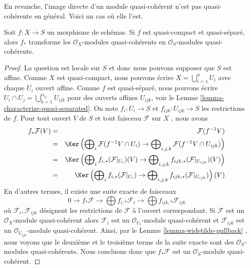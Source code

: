 En revanche, l'image directe d'un module quasi-cohérent n'est pas
quasi-cohérente en général. Voici un cas où elle l'est.

\begin{lemma}
\label{lemma-push-forward-quasi-coherent}
Soit  $f : X \to S$  un morphisme de schémas. Si  $f$  est quasi-compact et
quasi-séparé, alors  $f_*$  transforme les  $\mathcal{O}_X$-modules
quasi-cohérents en  $\mathcal{O}_S$-modules quasi-cohérents.
\end{lemma}

\begin{proof}
La question est locale sur  $S$  et donc nous pouvons supposer que
 $S$  est affine. Comme  $X$  est quasi-compact, nous pouvons écrire
 $X = \bigcup_{i = 1}^n U_i$  avec chaque  $U_i$  ouvert affine. Comme  $f$  est
quasi-séparé, nous pouvons écrire  $U_i \cap U_j = \bigcup_{k = 1}^{n_{ij}} U_{ijk}$  pour des ouverts affines
 $U_{ijk}$, voir le Lemme  \ref{lemma-characterize-quasi-separated}. On note  $f_i : U_i \to S$  et  $f_{ijk} : U_{ijk} \to S$  les
restrictions de  $f$. Pour tout ouvert  $V$  de  $S$  et
tout faisceau  $\mathcal{F}$  sur  $X$ , nous avons
\begin{eqnarray*}
f_*\mathcal{F}(V) & = & \mathcal{F}(f^{-1}V) \\
& = &
\Ker\left(
\bigoplus\nolimits_i \mathcal{F}(f^{-1}V \cap U_i)
\to
\bigoplus\nolimits_{i, j, k} \mathcal{F}(f^{-1}V \cap U_{ijk})\right) \\
& = &
\Ker\left(
\bigoplus\nolimits_i f_{i, *}(\mathcal{F}|_{U_i})(V)
\to
\bigoplus\nolimits_{i, j, k} f_{ijk, *}(\mathcal{F}|_{U_{ijk}})(V)\right) \\
& = &
\Ker\left(
\bigoplus\nolimits_i f_{i, *}(\mathcal{F}|_{U_i})
\to
\bigoplus\nolimits_{i, j, k} f_{ijk, *}(\mathcal{F}|_{U_{ijk}})\right)(V)
\end{eqnarray*}
En d'autres termes, il existe une suite exacte de faisceaux
$$
0 \to f_*\mathcal{F}
\to \bigoplus f_{i, *}\mathcal{F}_i
\to \bigoplus f_{ijk, *}\mathcal{F}_{ijk}
$$
où  $\mathcal{F}_i, \mathcal{F}_{ijk}$  désignent les restrictions de  $\mathcal{F}$  à l'ouvert correspondant.
Si  $\mathcal{F}$  est un  $\mathcal{O}_X$-module quasi-cohérent alors  $\mathcal{F}_i$  est
un  $\mathcal{O}_{U_i}$-module quasi-cohérent et  $\mathcal{F}_{ijk}$  est un  $\mathcal{O}_{U_{ijk}}$-module
quasi-cohérent. Ainsi, par le Lemme  \ref{lemma-widetilde-pullback} , nous voyons que le deuxième et
le troisième terme de la suite exacte sont des  $\mathcal{O}_S$-modules
quasi-cohérents. Nous concluons donc que  $f_*\mathcal{F}$  est un  $\mathcal{O}_S$-module
quasi-cohérent.
\end{proof}

